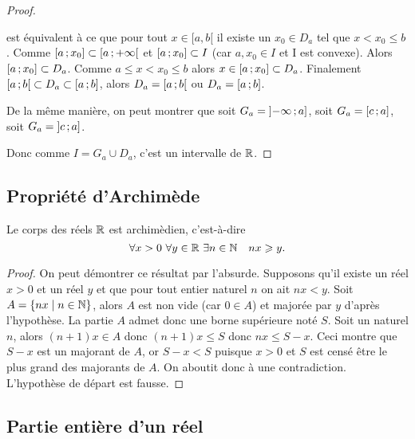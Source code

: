 \begin{proof}
\begin{itemize}
\begin{itemize}
          est équivalent à ce que pour tout \(x\in[a, b[\) il existe un \(x_0\in 
          D_a\) tel que \(x<x_0 \leqslant b\). Comme 
          \(\left[ a \, ;  x_0 \right]\subset \left[ a \, ;   + \infty \right[\) et 
          \(\left[ a \, ;  x_0 \right]\subset I\) (car \(a, x_0 \in I\) et I est 
          convexe). Alors \(\left[ a \, ;  x_0 \right] \subset D_a\). Comme 
          \(a\leqslant x < x_0\leqslant b\) alors \(x\in 
          \left[ a \, ;  x_0 \right]\subset D_a\). Finalement 
          \(\left[ a \, ;  b \right[\subset D_a \subset \left[ a \, ;  b \right]\), alors 
          \(D_a = \left[ a \, ;  b \right[\) ou \(D_a = \left[ a \, ;  b \right]\).
      \end{itemize}
      De la même manière, on peut montrer que soit \(G_a = \left]  - 
      \infty \, ;  a \right]\), soit \(G_a = \left[ c \, ;  a \right]\), soit \(G_a = 
      \left] c \, ;  a \right]\).
  \end{itemize}
  Donc comme \(I = G_a\cup D_a\), c'est un intervalle de \(\mathbb{R}\).
\end{proof}

\subsection{Propriété d'Archimède}
\begin{prop}
  Le corps des réels \(\mathbb{R}\) est archimèdien, c'est-à-dire
  \begin{equation}
    \forall x>0 \ \forall y\in \R \ \exists n\in \N \quad nx\geqslant y.
  \end{equation}
\end{prop}
\begin{proof}
  On peut démontrer ce résultat par l'absurde. Supposons qu'il existe un réel 
  \(x>0\) et un réel \(y\) et que pour tout entier naturel \(n\) on ait 
  \(nx<y\). Soit \(A = \left\{nx\mathrel{}\middle|\mathrel{}n\in \mathbb{N}\right\}\), alors \(A\) est non vide (car 
  \(0\in A\)) et majorée par \(y\) d'après l'hypothèse. La partie \(A\) admet 
  donc une borne supérieure noté \(S\). Soit un naturel \(n\), alors \((n + 1)x 
  \in A\) donc \((n + 1)x\leqslant S\) donc \(nx \leqslant S - x\). Ceci montre 
  que \(S - x\) est un majorant de \(A\), or \(S - x<S\) puisque \(x>0\) et 
  \(S\) est censé être le plus grand des majorants de \(A\). On aboutit donc à 
  une contradiction.  L'hypothèse de départ est fausse.
\end{proof}

\subsection{Partie entière d'un réel}

